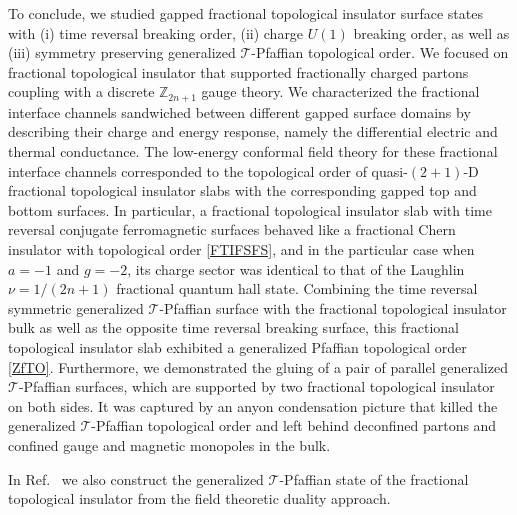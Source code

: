 To conclude, we studied gapped fractional topological insulator surface states with (i) time reversal breaking order, (ii) charge $U(1)$ breaking order, as well as (iii) symmetry preserving generalized $\mathcal{T}$-Pfaffian topological order. We focused on fractional topological insulator that supported fractionally charged partons coupling with a discrete $\mathbb{Z}_{2n+1}$ gauge theory. We characterized the fractional interface channels sandwiched between different gapped surface domains by describing their charge and energy response, namely the differential electric and thermal conductance. The low-energy conformal field theory for these fractional interface channels corresponded to the topological order of quasi-$(2+1)$-D fractional topological insulator slabs with the corresponding gapped top and bottom surfaces. In particular, a fractional topological insulator slab with time reversal conjugate ferromagnetic surfaces behaved like a fractional Chern insulator with topological order \eqref{FTIFSFS}, and in the particular case when $a=-1$ and $g=-2$, its charge sector was identical to that of the Laughlin $\nu=1/(2n+1)$ fractional quantum hall state. Combining the time reversal symmetric generalized $\mathcal{T}$-Pfaffian surface with the fractional topological insulator bulk as well as the opposite time reversal breaking surface, this fractional topological insulator slab exhibited a generalized Pfaffian topological order \eqref{ZfTO}. Furthermore, we demonstrated the gluing of a pair of parallel generalized $\mathcal{T}$-Pfaffian surfaces, which are supported by two fractional topological insulator on both sides. It was captured by an anyon condensation picture that killed the generalized $\mathcal{T}$-Pfaffian topological order and left behind deconfined partons and confined gauge and magnetic monopoles in the bulk. 

In Ref.~\cite{ChoTeoFradkin17} we also construct the generalized $\mathcal{T}$-Pfaffian state of the fractional topological insulator from the field theoretic duality approach.